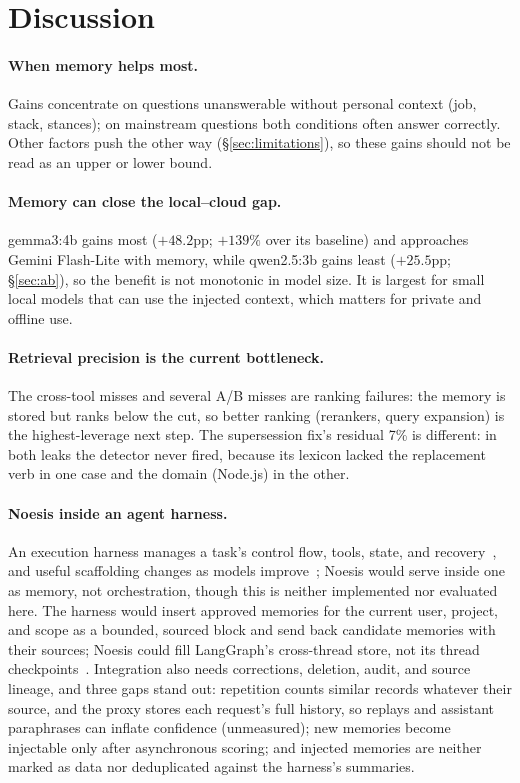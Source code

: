 \documentclass[11pt]{article}
\begin{document}
\section{Discussion}
\label{sec:discussion}

\paragraph{When memory helps most.} Gains concentrate on questions
unanswerable without personal context (job, stack, stances); on mainstream
questions both conditions often answer correctly. Other factors push the other
way (\S\ref{sec:limitations}), so these gains should not be read as an upper
or lower bound.

\paragraph{Memory can close the local--cloud gap.} gemma3:4b gains most
($+48.2$pp; $+139\%$ over its baseline) and approaches Gemini Flash-Lite with
memory, while qwen2.5:3b gains least ($+25.5$pp; \S\ref{sec:ab}), so the
benefit is not monotonic in model size. It is largest for small local models
that can use the injected context, which matters for private and offline use.

\paragraph{Retrieval precision is the current bottleneck.} The cross-tool
misses and several A/B misses are ranking failures: the memory is stored but
ranks below the cut, so better ranking (rerankers, query expansion) is the
highest-leverage next step. The supersession fix's residual 7\% is different:
in both leaks the detector never fired, because its lexicon lacked the
replacement verb in one case and the domain (Node.js) in the other.

\paragraph{Noesis inside an agent harness.} An execution harness manages a
task's control flow, tools, state, and recovery~\citep{anthropicharness}, and
useful scaffolding changes as models improve~\citep{anthropicharness2026};
Noesis would serve inside one as memory, not orchestration, though this is
neither implemented nor evaluated here. The harness would insert approved
memories for the current user, project, and scope as a bounded, sourced block
and send back candidate memories with their sources; Noesis could fill
LangGraph's cross-thread store, not its thread checkpoints~\citep{langgraph}.
Integration also needs corrections, deletion, audit, and source lineage, and
three gaps stand out: repetition counts similar records whatever their source,
and the proxy stores each request's full history, so replays and assistant
paraphrases can inflate confidence (unmeasured); new memories become
injectable only after asynchronous scoring; and injected memories are neither
marked as data nor deduplicated against the harness's summaries.
\end{document}
